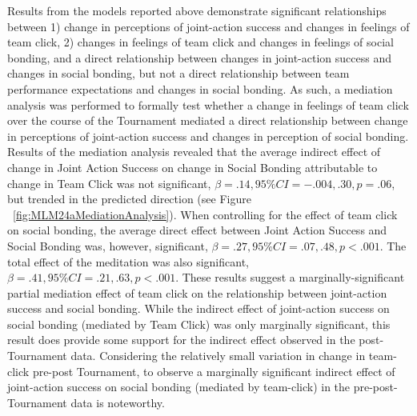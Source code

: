
  Results from the models reported above demonstrate significant relationships between 1) change in perceptions of joint-action success and changes in feelings of team click, 2) changes in feelings of team click and changes in feelings of social bonding, and a direct relationship between changes in joint-action success and changes in social bonding, but not a direct relationship between team performance expectations and changes in social bonding. As such, a mediation analysis was performed to formally test whether a change in feelings of team click over the course of the Tournament mediated a direct relationship between change in perceptions of joint-action success and changes in perception of social bonding.\\

  Results of the mediation analysis revealed that the average indirect effect of change in Joint Action Success on change in Social Bonding attributable to change in Team Click was not significant, $\beta = .14, 95\% CI = -.004 , .30, p = .06$, but trended in the predicted direction (see Figure ~\ref{fig:MLM24aMediationAnalysis}).  When controlling for the effect of team click on social bonding, the average direct effect between Joint Action Success and Social Bonding was, however, significant, $\beta = .27, 95\% CI = .07 , .48, p < .001$.  The total effect of the meditation was also significant, $\beta = .41, 95\% CI = .21 , .63, p < .001$.  These results suggest a marginally-significant partial mediation effect of team click on the relationship between joint-action success and social bonding.  While the indirect effect of joint-action success on social bonding (mediated by Team Click) was only marginally significant, this result does provide some support for the indirect effect observed in the post-Tournament data.  Considering the relatively small variation in change in team-click pre-post Tournament, to observe a marginally significant indirect effect of joint-action success on social bonding (mediated by team-click) in the pre-post-Tournament data is noteworthy.


